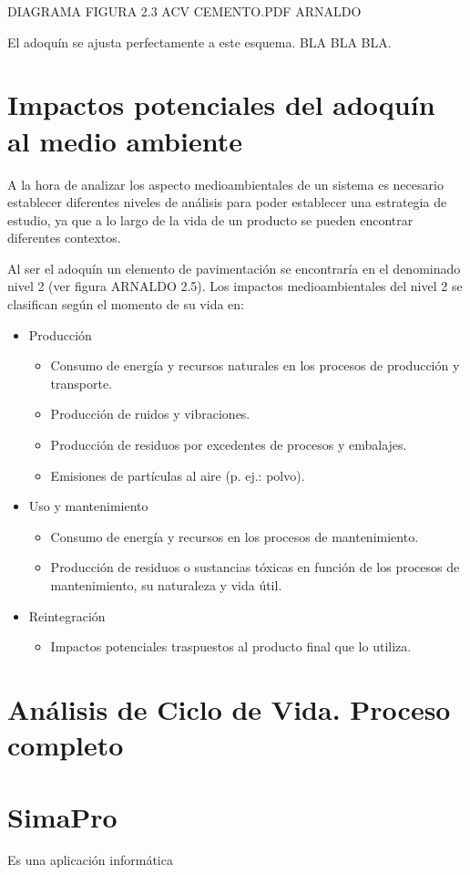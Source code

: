 DIAGRAMA FIGURA 2.3 ACV CEMENTO.PDF ARNALDO

El adoquín se ajusta perfectamente a este esquema. BLA BLA BLA.

\section{Impactos potenciales del adoquín al medio ambiente}
A la hora de analizar los aspecto medioambientales de un sistema es necesario establecer diferentes niveles de análisis para poder establecer una estrategia de estudio, ya que a lo largo de la vida de un producto se pueden encontrar diferentes contextos.

Al ser el adoquín un elemento de pavimentación se encontraría en el denominado nivel 2 (ver figura ARNALDO 2.5). Los impactos medioambientales del nivel 2 se clasifican según el momento de su vida en:

\begin{itemize}
  \item Producción
    \begin{itemize}
     \item Consumo de energía y recursos naturales en los procesos de producción y transporte.
     \item Producción de ruidos y vibraciones.
     \item Producción de residuos por excedentes de procesos y embalajes.
     \item Emisiones de partículas al aire (p. ej.: polvo).
    \end{itemize}
  \item Uso y mantenimiento
    \begin{itemize}
      \item Consumo de energía y recursos en los procesos de mantenimiento.
      \item Producción de residuos o sustancias tóxicas en función de los procesos de mantenimiento, su naturaleza y vida útil.
    \end{itemize}
  \item Reintegración
    \begin{itemize}
      \item Impactos potenciales traspuestos al producto final que lo utiliza.
    \end{itemize}
\end{itemize}

\section{Análisis de Ciclo de Vida. Proceso completo}

\section{SimaPro}
Es una aplicación informática \cite{mgoedkoop}
